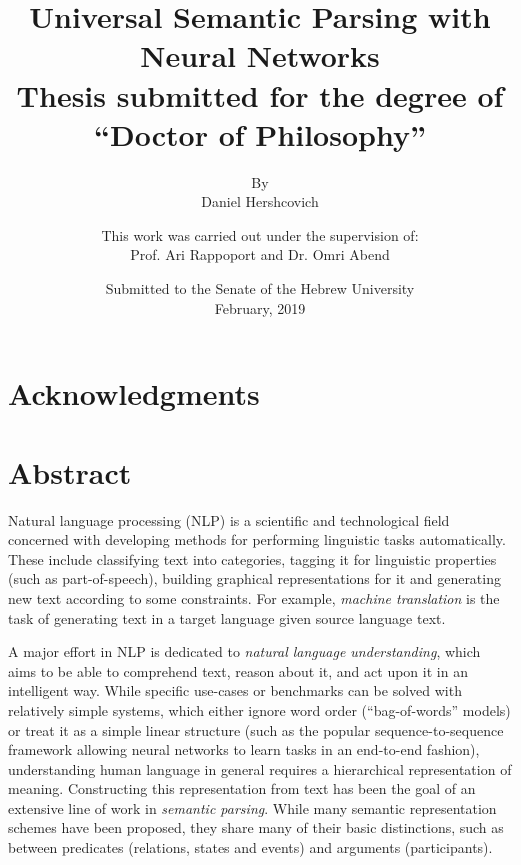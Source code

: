 \documentclass[12pt,a4paper]{report}
\title{
\textbf{Universal Semantic Parsing with Neural Networks} \\
\vspace{2cm}
{\large Thesis submitted for the degree of \\
``Doctor of Philosophy''}
}
\author{
By \\
Daniel Hershcovich
\vspace{2cm}
}
\date{
Submitted to the Senate of the Hebrew University \\
February, 2019
}
\begin{document}
\maketitle
\maketitle
\clearpage
\title{}
\author{
This work was carried out under the supervision of: \\
Prof. Ari Rappoport and Dr. Omri Abend
}
\date{}
\maketitle

\section*{Acknowledgments}

\pagebreak

\section*{Abstract}

Natural language processing (NLP) is a scientific and technological field
concerned with developing methods for performing linguistic tasks automatically.
These include classifying text into categories,
tagging it for linguistic properties (such as part-of-speech),
building graphical representations for it
and generating new text according to some constraints.
For example, \textit{machine translation} is the task of generating
text in a target language given source language text.

A major effort in NLP is dedicated to \textit{natural language understanding},
which aims to be able to comprehend text, reason about it, and act upon it
in an intelligent way.
While specific use-cases or benchmarks can be solved with relatively simple
systems, which either ignore word order (``bag-of-words'' models) or treat
it as a simple linear structure
(such as the popular sequence-to-sequence framework allowing neural networks
to learn tasks in an end-to-end fashion),
understanding human language in general
requires a hierarchical representation of meaning.
Constructing this representation from text has been the goal of an extensive
line of work in \textit{semantic parsing}.
While many semantic representation schemes have been proposed,
they share many of their basic distinctions, such as between predicates
(relations, states and events) and arguments (participants).
\end{document}

